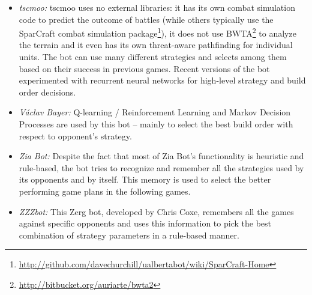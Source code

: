 \begin{itemize}
  \item {\em tscmoo:} tscmoo uses no external libraries: it has its own combat simulation code to predict the outcome of battles (while others typically use the SparCraft combat simulation package\footnote{\url{http://github.com/davechurchill/ualbertabot/wiki/SparCraft-Home}}), it does not use BWTA\footnote{\url{http://bitbucket.org/auriarte/bwta2}} to analyze the terrain and it even has its own threat-aware pathfinding for individual units. The bot can use many different strategies and selects among them based on their success in previous games. Recent versions of the bot experimented with recurrent neural networks for high-level strategy and build order decisions.
  
  \item {\em V\'{a}clav Bayer:} Q-learning / Reinforcement Learning and Markov Decision Processes are used by this bot -- mainly to select the best build order with respect to opponent's strategy.
  
  \item {\em Zia Bot:} Despite the fact that most of Zia Bot's functionality is heuristic and rule-based, the bot tries to recognize and remember all the strategies used by its opponents and by itself. This memory is used to select the better performing game plans in the following games.
  
  \item {\em ZZZbot:} This Zerg bot, developed by Chris Coxe, remembers all the games against specific opponents and uses this information to pick the best combination of strategy parameters in a rule-based manner.   

\end{itemize}
